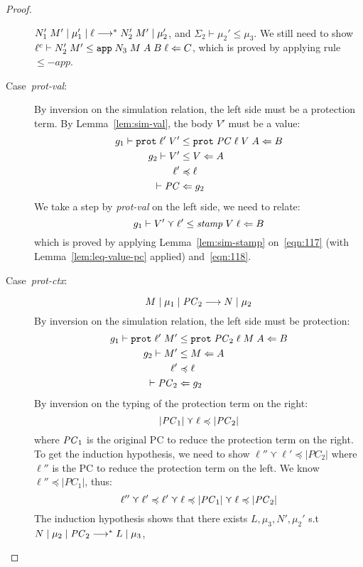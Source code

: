 \begin{proof}
\begin{description}
      ${N_1'\;M'}\mid{\mu_1'}\mid{\ell}\longrightarrow^{*}{N_2'\;M'}\mid{\mu_2'}$, and $\Sigma_2 \vdash \mu_2' \leq \mu_3$.
      We still need to show ${\ell^c}\vdash{N_2'\;M'}\leq{\ensuremath{\text{\texttt{{app}}}\;{N_3}\;{M}\;{A}\;{B}\;{\ell}}}\Leftarrow{C}$, which is proved by applying
      rule ${\leq}\mathit{-app}$.
  \item[Case~\textit{prot-val}:]
    By inversion on the simulation relation, the left side must be a protection term.
    By Lemma~\ref{lem:sim-val}, the body $V'$ must be a value:
    \begin{align}
    g_1 \vdash \text{\texttt{{prot}}}\;{\ell'}\;{V'} &\leq \text{\texttt{{prot}}}\;{\mathit{PC}}\;{\ell}\;{V}\;{A} \Leftarrow B  \\
    g_2 \vdash V' &\leq V \Leftarrow A \label{eqn:117} \\
    \ell' &\preccurlyeq \ell \label{eqn:118} \\
    \vdash \mathit{PC} &\Leftarrow g_2
    \end{align}
    We take a step by \textit{prot-val} on the left side, we need to relate:
    \[
    {g_1}\vdash{V' \curlyvee \ell'}\leq{\mathit{stamp}\;V\;\ell}\Leftarrow{B}
    \]
    which is proved by applying Lemma~\ref{lem:sim-stamp} on~\eqref{eqn:117} (with Lemma~\ref{lem:leq-value-pc} applied)
    and~\eqref{eqn:118}.
  \item[Case~\textit{prot-ctx}:]
  \[
  \reduce{M}{\mu_1}{\PC_2}{N}{\mu_2}
  \]
  By inversion on the simulation relation, the left side must be protection:
  \begin{align}
    g_1 \vdash \text{\texttt{{prot}}}\;{\ell'}\;{M'} &\leq \text{\texttt{{prot}}}\;{\mathit{PC}_2}\;{\ell}\;{M}\;{A} \Leftarrow B  \\
    g_2 \vdash M' &\leq M \Leftarrow A \\
    \ell' &\preccurlyeq \ell \\
    \vdash \mathit{PC}_2 &\Leftarrow g_2
  \end{align}
  By inversion on the typing of the protection term on the right:
  \begin{equation}
  \label{eqn:119}
  |\mathit{PC}_1| \curlyvee \ell \preccurlyeq |\mathit{PC}_2|
  \end{equation}
  where $\mathit{PC}_1$ is the original PC to reduce the protection term on the right.
  To get the induction hypothesis, we need to show $\ell'' \curlyvee \ell' \preccurlyeq |PC_2|$
  where $\ell''$ is the PC to reduce the protection term on the left.
  We know $\ell'' \preccurlyeq |PC_1|$, thus:
  \[
  \ell'' \curlyvee \ell' \preccurlyeq \ell' \curlyvee \ell \preccurlyeq |\mathit{PC}_1| \curlyvee \ell \preccurlyeq |\mathit{PC}_2|
  \]
  The induction hypothesis shows that there exists $L, \mu_3, N', \mu_2'$ s.t
  $\reducemult{N}{\mu_2}{\PC_2}{L}{\mu_3}$,

\end{description}
\end{proof}
